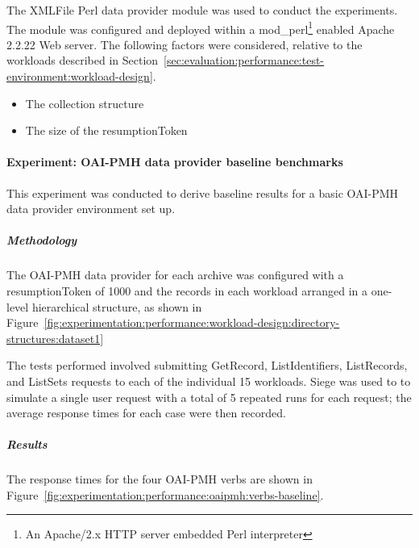 The XMLFile Perl data provider module \citep{Suleman2002} was used to conduct the
experiments. The module was configured and deployed within a
mod\_perl\footnote{An Apache/2.x HTTP server embedded Perl interpreter}
enabled Apache 2.2.22 Web server. The following factors were considered,
relative to the workloads described in Section~\ref{sec:evaluation:performance:test-environment:workload-design}.

\begin{itemize}
 \item The collection structure
 \item The size of the resumptionToken
\end{itemize}

\paragraph{Experiment: OAI-PMH data provider baseline benchmarks}
\label{sec:evaluation:performance:oaipmh-data-provider:experiment1}

This experiment was conducted to derive baseline results for a basic OAI-PMH
data provider environment set up.

\subparagraph{Methodology} %

The OAI-PMH data provider for each archive was configured with a resumptionToken of
1000 and the records in each workload arranged in a one-level hierarchical
structure, as shown in Figure~\ref{fig:experimentation:performance:workload-design:directory-structures:dataset1}

The tests performed involved submitting GetRecord, ListIdentifiers, ListRecords, and ListSets requests to each of the individual 15 workloads. Siege was used to to simulate a single user request with a total of 5 repeated runs for each request; the average response times for each case were then recorded.

\subparagraph{Results}

The response times for the four OAI-PMH verbs are shown in Figure~\ref{fig:experimentation:performance:oaipmh:verbs-baseline}.

